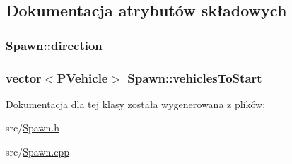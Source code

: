 \subsection{Dokumentacja atrybutów składowych}
\hypertarget{class_spawn_a593c6fb8ae012980751c4364b8ebb5b5}{
\subsubsection[{direction}]{ Spawn\-::direction\hspace{0.3cm}{\ttfamily [private]}}}\label{class_spawn_a593c6fb8ae012980751c4364b8ebb5b5}
\hypertarget{class_spawn_a9796373f175f911096daa7ffda1186ea}{
\subsubsection[{vehicles\-To\-Start}]{\setlength{\rightskip}{0pt plus 5cm}vector$<${\bf P\-Vehicle}$>$ Spawn\-::vehicles\-To\-Start\hspace{0.3cm}{\ttfamily [private]}}}\label{class_spawn_a9796373f175f911096daa7ffda1186ea}


Dokumentacja dla tej klasy została wygenerowana z plików\-:\begin{DoxyCompactItemize}
\item 
src/\hyperlink{_spawn_8h}{Spawn.\-h}\item 
src/\hyperlink{_spawn_8cpp}{Spawn.\-cpp}\end{DoxyCompactItemize}
